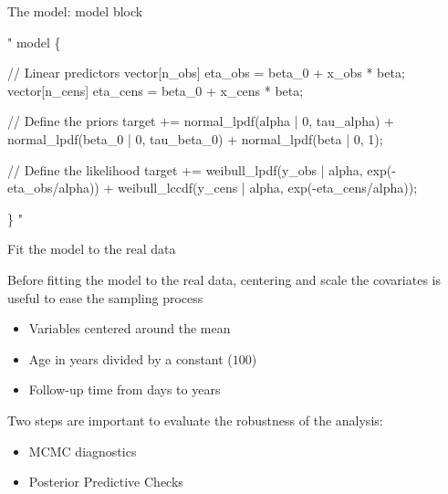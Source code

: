 \documentclass[ignorenonframetext,a4paper]{beamer}
\newenvironment{Shaded}{\begin{snugshade}}{\end{snugshade}}
\newcommand{\StringTok}[1]{\textcolor[rgb]{0.31,0.60,0.02}{#1}}
\begin{document}
\begin{frame}[fragile]{The model: model block}

\scriptsize

\begin{Shaded}
\begin{Highlighting}[]
\StringTok{"}
\StringTok{model \{}

\StringTok{  // Linear predictors}
\StringTok{  vector[n_obs] eta_obs = beta_0 + x_obs * beta;}
\StringTok{  vector[n_cens] eta_cens = beta_0 + x_cens * beta;}

\StringTok{  // Define the priors}
\StringTok{  target += normal_lpdf(alpha | 0, tau_alpha) +}
\StringTok{            normal_lpdf(beta_0 | 0, tau_beta_0) +}
\StringTok{            normal_lpdf(beta | 0, 1);}

\StringTok{  // Define the likelihood}
\StringTok{  target += weibull_lpdf(y_obs | alpha, exp(-eta_obs/alpha)) +}
\StringTok{            weibull_lccdf(y_cens | alpha, exp(-eta_cens/alpha));}

\StringTok{\}}
\StringTok{"}
\end{Highlighting}
\end{Shaded}

\end{frame}

\begin{frame}{Fit the model to the real data}

Before fitting the model to the real data, centering and scale the
covariates is useful to ease the sampling process

\begin{itemize}
  \item{Variables centered around the mean}
  \item{Age in years divided by a constant ($100$)}
  \item{Follow-up time from days to years}
\end{itemize}

Two steps are important to evaluate the robustness of the analysis:

\begin{itemize}
  \item{MCMC diagnostics}
  \item{Posterior Predictive Checks}
\end{itemize}

\end{frame}
\end{document}
